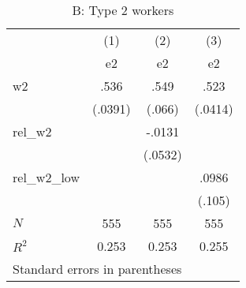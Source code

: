 \begin{table}[htbp]\centering
\caption{B: Type 2 workers}
\begin{tabular}{l*{3}{c}}
\hline\hline
            &\multicolumn{1}{c}{(1)}&\multicolumn{1}{c}{(2)}&\multicolumn{1}{c}{(3)}\\
            &\multicolumn{1}{c}{e2}&\multicolumn{1}{c}{e2}&\multicolumn{1}{c}{e2}\\
\hline
w2          &        .536&        .549&        .523\\
            &     (.0391)&      (.066)&     (.0414)\\
[1em]
rel\_w2      &            &      -.0131&            \\
            &            &     (.0532)&            \\
[1em]
rel\_w2\_low  &            &            &       .0986\\
            &            &            &      (.105)\\
\hline
\(N\)       &         555&         555&         555\\
\(R^{2}\)   &       0.253&       0.253&       0.255\\
\hline\hline
\multicolumn{4}{l}{\footnotesize Standard errors in parentheses}\\
\end{tabular}
\end{table}
